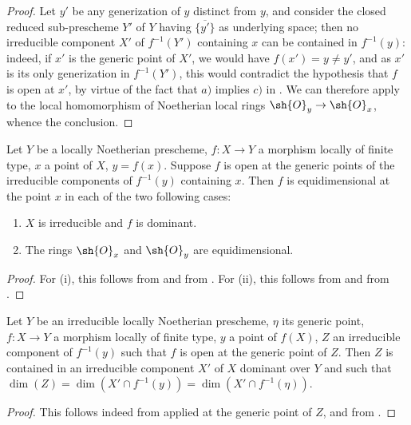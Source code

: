 \begin{proof}
Let $y'$ be any generization of $y$ distinct from $y$, and consider the closed reduced sub-prescheme $Y'$ of $Y$ having $\overline{\{y'\}}$ as underlying space; then no irreducible component $X'$ of $f^{-1}(Y')$ containing $x$ can be contained in $f^{-1}(y)$: indeed, if $x'$ is the generic point of $X'$, we would have $f(x')=y\neq y'$, and as $x'$ is its only generization in $f^{-1}(Y')$, this would contradict the hypothesis that $f$ is open at $x'$, by virtue of the fact that $a)$ implies $c)$ in .
We can therefore apply  to the local homomorphism of Noetherian local rings $\sh{O}_y\to\sh{O}_x$, whence the conclusion.
\end{proof}

\begin{corollary}[14.2.2]
\label{IV.14.2.2}
Let $Y$ be a locally Noetherian prescheme, $f:X\to Y$ a morphism locally of finite type, $x$ a point of $X$, $y=f(x)$.
Suppose $f$ is open at the generic points of the irreducible components of $f^{-1}(y)$ containing $x$.
Then $f$ is equidimensional at the point $x$ in each of the two following cases:
\begin{enumerate}[label=(\roman*)]
  \item $X$ is irreducible and $f$ is dominant.
  \item The rings $\sh{O}_x$ and $\sh{O}_y$ are equidimensional.
\end{enumerate}
\end{corollary}

\begin{proof}
For (i), this follows from  and from .
For (ii), this follows from  and from .
\end{proof}

\begin{proposition}[14.2.3]
\label{IV.14.2.3}
Let $Y$ be an irreducible locally Noetherian prescheme, $\eta$ its generic point, $f:X\to Y$ a morphism locally of finite type, $y$ a point of $f(X)$, $Z$ an irreducible component of $f^{-1}(y)$ such that $f$ is open at the generic point of $Z$.
Then $Z$ is contained in an irreducible component $X'$ of $X$ dominant over $Y$ and such that $\dim(Z)=\dim(X'\cap f^{-1}(y))=\dim(X'\cap f^{-1}(\eta))$.
\end{proposition}

\begin{proof}
This follows indeed from  applied at the generic point of $Z$, and from .
\end{proof}

